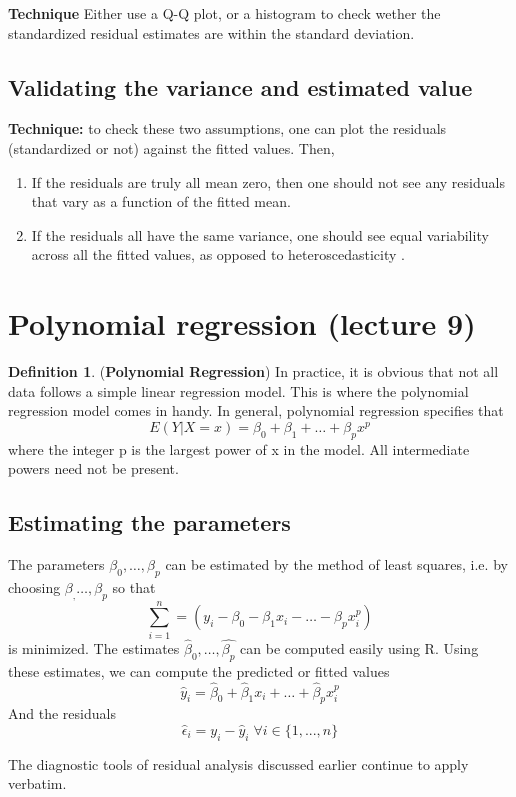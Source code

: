 \documentclass[12pt]{article}
\theoremstyle{definition}
\newtheorem{definition}{Definition}[section]
\theoremstyle{remark}
\begin{document}
\textbf{Technique}
\newline
Either use a Q-Q plot, or a histogram to check wether the 
standardized residual estimates are within the standard deviation.
\subsection{Validating the variance and estimated value}
\textbf{Technique:} to check these two assumptions, one can plot the residuals (standardized or not) against the fitted values.
Then, 
\begin{enumerate}
    \item If the residuals are truly all mean zero, then one should not see any residuals 
    that vary as a function of the fitted mean.
    \item If the residuals all have the same variance, 
    one should see equal variability across all the fitted values, as opposed 
    to heteroscedasticity .
\end{enumerate}

\section{Polynomial regression (lecture 9)}
\begin{definition}(\textbf{Polynomial Regression})
    In practice, it is obvious that not all data follows a simple 
    linear regression model. This is where the polynomial regression
    model comes in handy. In general, polynomial regression specifies that
    $$E(Y| X=x)= \beta_0 + \beta_1 + \hdots + \beta_px^p$$
    where the integer p is the largest power of x in the model.
    All intermediate powers need not be present.
\end{definition}
\subsection{Estimating the parameters}
The parameters $\beta_0, \hdots, \beta_p$ can be estimated by the 
method of least squares, i.e. by choosing $\beta_, \hdots, \beta_p$
so that $$\sum_{i=1}^n= (y_i - \beta_0-\beta_1x_i - \hdots -\beta_px^p_i)$$
is minimized. The estimates $\hat{\beta}_0, \hdots, \hat{\beta_p}$ can be 
computed easily using R. Using these estimates, we can compute the predicted or fitted values
$$\hat{y}_i = \hat{\beta}_0 + \hat{\beta}_1 x_i + \hdots + \hat{\beta}_p x^p_i$$
And the residuals 
$$\hat{\epsilon}_i = y_i - \hat{y}_i \; \forall i \in \{1,...,n\}$$
\begin{note}
    The diagnostic tools of residual analysis discussed earlier continue to apply verbatim.
\end{note}
\end{document}
